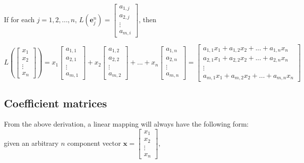 \documentclass{article}
\begin{document}
If for each \(j = 1, 2, ..., n\), \(L(\mathbf{e}^n_j) = \begin{bmatrix} a_{1,j} \\ a_{2,j} \\ \vdots \\ a_{m,i} \end{bmatrix}\), then  

\[L\left(\begin{bmatrix} x_1 \\ x_2 \\ \vdots \\ x_n \end{bmatrix}\right) = x_1 \begin{bmatrix} a_{1,1} \\ a_{2,1} \\ \vdots \\ a_{m,1} \end{bmatrix} + x_2 \begin{bmatrix} a_{1,2} \\ a_{2,2} \\ \vdots \\ a_{m,2} \end{bmatrix} + ... + x_n \begin{bmatrix} a_{1,n} \\ a_{2,n} \\ \vdots \\ a_{m,n} \end{bmatrix}
= \begin{bmatrix} a_{1,1}x_1 + a_{1,2}x_2 + ... + a_{1,n}x_n \\ a_{2,1}x_1 + a_{2,2}x_2 + ... + a_{2,n}x_n \\ \vdots \\ a_{m,1}x_1 + a_{m,2}x_2 + ... + a_{m,n}x_n \end{bmatrix}\]



\subsection*{Coefficient matrices}

From the above derivation, a linear mapping will always have the following form: given an arbitrary \(n\) component vector \(\mathbf{x} = \begin{bmatrix} x_1 \\ x_2 \\ \vdots \\ x_n \end{bmatrix}\),
\end{document}
